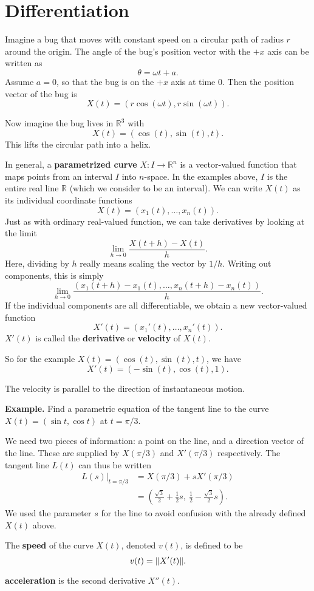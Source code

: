 \documentclass{article}
\begin{document}



\section*{Differentiation}

Imagine a bug that moves with constant speed on a circular path of 
radius $r$ around the origin.
The angle of the bug's position vector with the $+x$ axis can
be written as 
\[\theta = \omega t + a.\]
Assume $a=0$, so that the bug is on the $+x$ axis at time $0$.
Then the position vector of the bug is 
\[X(t) = (r \cos (\omega t), r \sin(\omega t)).\]

Now imagine the bug lives in $\mathbb{R}^3$ with
\[X(t) = (\cos(t), \sin(t), t).\]
This lifts the circular path into a helix.

In general, a \textbf{parametrized curve} $X : I \to \mathbb{R}^n$ is a vector-valued function
that maps points from an interval $I$ into $n$-space. In the examples above,
$I$ is the entire real line $\mathbb{R}$ (which we consider to be an interval). 
We can write $X(t)$ as its individual coordinate functions
\[X(t) = (x_1(t), \ldots, x_n(t)).\]
Just as with ordinary real-valued function, we can take derivatives by 
looking at the limit
\[\lim_{h \to 0} \frac{X(t+h)-X(t)}{h}.\]
Here, dividing by $h$ really means scaling the vector by $1/h$. Writing out components, this is simply
\[\lim_{h \to 0} \frac{(x_1(t+h)-x_1(t), \ldots, x_n(t+h)-x_n(t))}{h}.\]
If the individual components are all differentiable, we obtain a
new vector-valued function
\[X'(t) = (x_1'(t), \ldots, x_n'(t)).\]
$X'(t)$ is called the \textbf{derivative} or \textbf{velocity} of $X(t)$. 

So for the example $X(t) = (\cos(t), \sin(t), t)$, we have
\[X'(t) = (-\sin(t), \cos(t), 1).\]

The velocity is parallel to the direction of instantaneous motion.


\textbf{Example.} 
Find a parametric equation of the tangent line to the curve $X(t) = (\sin t, \cos t)$
at $t=\pi/3$. 

We need two pieces of information: a point on the line, and a direction vector of the line.
These are supplied by $X(\pi/3)$ and $X'(\pi/3)$ respectively. The tangent line $L(t)$ can thus be 
written 
\begin{align*}
    L(s) |_{t=\pi/3} &= X(\pi/3) + sX'(\pi/3)  \\
    &= \left( \frac{\sqrt{3}}{2} + \frac{1}{2}s,\ \frac{1}{2} - \frac{\sqrt{3}}{2}s \right).
\end{align*}
We used the parameter $s$ for the line to avoid confusion with the already defined $X(t)$ above.

The \textbf{speed} of the curve $X(t)$, denoted $v(t)$, is defined to be 
\[v(t) = \norm{X'(t)}.\]

\textbf{acceleration} is the second derivative $X''(t)$.
\end{document}
